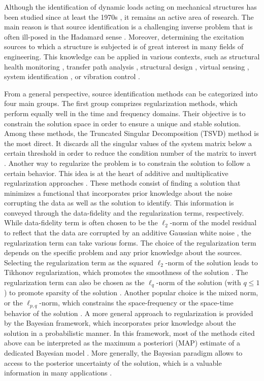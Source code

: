 \documentclass[5p,12pt]{elsarticle}
\begin{document}
Although the identification of dynamic loads acting on mechanical structures has been studied since at least the 1970s \cite{Orm74,Fla77}, it remains an active area of research. The main reason is that source identification is a challenging inverse problem that is often ill-posed in the Hadamard sense \cite{Had02}. Moreover, determining the excitation sources to which a structure is subjected is of great interest in many fields of engineering. This knowledge can be applied in various contexts, such as structural health monitoring \cite{Fri13}, transfer path analysis \cite{Jan99}, structural design \cite{Cor08}, virtual sensing \cite{Jan19}, system identification \cite{Rog22}, or vibration control \cite{Lei20}. \bigskip

From a general perspective, source identification methods can be categorized into four main groups. The first group comprizes regularization methods, which perform equally well in the time and frequency domains. Their objective is to constrain the solution space in order to ensure a unique and stable solution. Among these methods, the Truncated Singular Decomposition (TSVD) method is the most direct. It discards all the singular values of the system matrix below a certain threshold in order to reduce the condition number of the matrix to invert \cite{Pot84, Sun20}. Another way to regularize the problem is to constrain the solution to follow a certain behavior. This idea is at the heart of additive and multiplicative regularization approaches \cite{Li10}. These methods consist of finding a solution that minimizes a functional that incorporates prior knowledge about the noise corrupting the data as well as the solution to identify. This information is conveyed through the data-fidelity and the regularization terms, respectively. While data-fidelity term is often chosen to be the $\ell_2$-norm of the model residual to reflect that the data are corrupted by an additive Gaussian white noise \cite{Auc16}, the regularization term can take various forms. The choice of the regularization term depends on the specific problem and any prior knowledge about the sources. Selecting the regularization term as the squared $\ell_2$-norm of the solution leads to Tikhonov regularization, which promotes the smoothness of the solution \cite{Thi03,Ren13}. The regularization term can also be chosen as the $\ell_q$-norm of the solution (with $q \leq 1$) to promote sparsity of the solution \cite{Qia17,Auc17}. Another popular choice is the mixed norm, or the $\ell_{p,q}$-norm, which constrains the space-frequency or the space-time behavior of the solution \cite{Rez16,Auc19}. A more general approach to regularization is provided by the Bayesian framework, which incorporates prior knowledge about the solution in a probabilistic manner. In this framework, most of the methods cited above can be interpreted as the maximum a posteriori (MAP) estimate of a dedicated Bayesian model \cite{Li18,Auc19b}. More generally, the Bayesian paradigm allows to access to the posterior uncertainty of the solution, which is a valuable information in many applications \cite{Zha12,Fau17,Auc18}. \\
\end{document}

